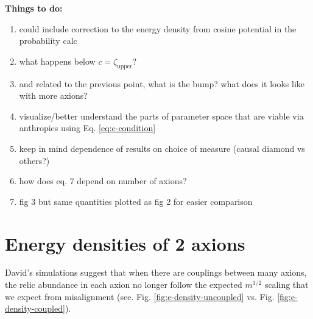 \documentclass{article}
\begin{document}
\color{red}\noindent \textbf{Things to do:}
\begin{enumerate}
    \item could include correction to the energy density from cosine potential in the probability calc
    \item what happens below $c=\zeta_\text{upper}$?
    \item and related to the previous point, what is the bump? what does it looks like with more axions?
    \item visualize/better understand the parts of parameter space that are viable via anthropics using Eq. \eqref{eq:c-condition}
    \item keep in mind dependence of results on choice of measure (causal diamond vs others?)
    \item how does eq. 7 depend on number of axions?
    \item fig 3 but same quantities plotted as fig 2 for easier comparison
\end{enumerate}\color{black}

\section{Energy densities of 2 axions}

David's simulations suggest that when there are couplings between many axions, the relic abundance in each axion no longer follow the expected $m^{1/2}$ scaling that we expect from misalignment (see. Fig. \ref{fig:e-density-uncoupled} vs. Fig. \ref{fig:e-density-coupled}).
\end{document}
